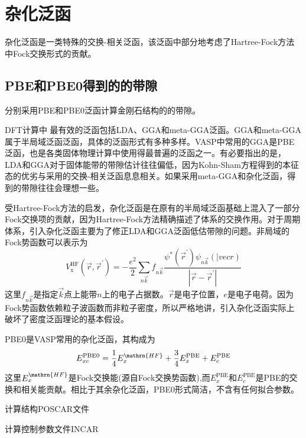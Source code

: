 \section{杂化泛函}
杂化泛函是一类特殊的交换-相关泛函，该泛函中部分地考虑了\textrm{Hartree-Fock}方法中\textrm{Fock}交换形式的贡献。

\subsection{\rm{PBE}和\rm{PBE0}得到的的带隙}
分别采用\textrm{PBE}和\textrm{PBE0}泛函计算金刚石结构的的带隙。

\textrm{DFT}计算中  最有效的泛函包括\textrm{LDA}、\textrm{GGA}和\textrm{meta-GGA}泛函。\textrm{GGA}和\textrm{meta-GGA}属于半局域泛函泛函，具体的泛函形式有多种多样。\textrm{VASP}中常用的\textrm{GGA}是\textrm{PBE}泛函，也是各类固体物理计算中使用得最普遍的泛函之一。有必要指出的是，\textrm{LDA}和\textrm{GGA}对于固体能带的带隙估计往往偏低，因为\textrm{Kohn-Sham}方程得到的本征态的优劣与采用的交换-相关泛函息息相关。如果采用\textrm{meta-GGA}和杂化泛函，得到的带隙往往会理想一些。

受\textrm{Hartree-Fock}方法的启发，杂化泛函是在原有的半局域泛函基础上混入了一部分\textrm{Fock}交换项的贡献，因为\textrm{Hartree-Fock}方法精确描述了体系的交换作用。对于周期体系，引入杂化泛函主要为了修正\textrm{LDA}和\textrm{GGA}泛函低估带隙的问题。非局域的\textrm{Fock}势函数可以表示为
\begin{displaymath}
	V_{\mathrm{x}}^{\mathrm{HF}}(\vec r,\vec r^{\prime})=-\dfrac{e^2}2\sum_{n\vec k}f_{n\vec k}\dfrac{\psi^{\ast}(\vec r^{\prime})\psi_{n\vec k}(|vec r)}{|\vec r-\vec r^{\prime}|}
\end{displaymath}
这里$f_{n\vec k}$是指定$\vec k$点上能带$n$上的电子占据数。$\vec r$是电子位置，$e$是电子电荷。因为\textrm{Fock}势函数依赖粒子波函数而非粒子密度，所以严格地讲，引入杂化泛函实际上破坏了密度泛函理论的基本假设。

\textrm{PBE0}是\textrm{VASP}常用的杂化泛函，其构成为
\begin{displaymath}
	E_{xc}^{\mathrm{PBE0}}=\dfrac14E_{x}^{\mathrn{HF}}+\dfrac34E_x^{\mathrm{PBE}}+E_c^{\mathrm{PBE}}
\end{displaymath}
这里$E_{x}^{\mathrn{HF}}$是\textrm{Fock}交换能(源自\textrm{Fock}交换势函数),而$E_x^{\mathrm{PBE}}$和$E_c^{\mathrm{PBE}}$是\textrm{PBE}的交换和相关能贡献。相比于其余杂化泛函，\textrm{PBE0}形式简洁，不含有任何拟合参数。

计算结构\textrm{POSCAR}文件

计算控制参数文件\textrm{INCAR}

